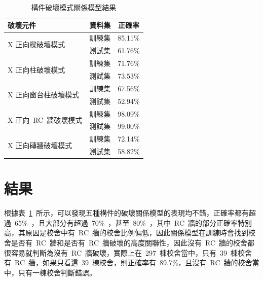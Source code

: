 

\setlength{\tabcolsep}{2em}
{\renewcommand{\arraystretch}{1.5}
\begin{table}[hbtp]
  \begin{center}
    \caption{構件破壞模式關係模型結果}
    \label{tab:comp_result}
    \begin{tabular}{l c c}
    	\hline
    	破壞元件 & 資料集 & 正確率 \\
    	\hline
    	\multirow{2}{*}{X 正向樑破壞模式} & 訓練集 & 85.11\% \\
    	\cline{2-3} & 測試集 & 61.76\% \\
    	\hline
    	\multirow{2}{*}{X 正向柱破壞模式} & 訓練集 & 71.76\% \\
    	\cline{2-3} & 測試集 & 73.53\% \\
    	\hline
    	\multirow{2}{*}{X 正向窗台柱破壞模式} & 訓練集 & 67.56\% \\
    	\cline{2-3} & 測試集 & 52.94\% \\
    	\hline
    	\multirow{2}{*}{X 正向~RC~牆破壞模式} & 訓練集 & 98.09\% \\
    	\cline{2-3} & 測試集 & 99.00\% \\
    	\hline
    	\multirow{2}{*}{X 正向磚牆破壞模式} & 訓練集 & 72.14\% \\
    	\cline{2-3} & 測試集 & 58.82\% \\
    	\hline
    \end{tabular}
  \end{center}
\end{table}
}

\section{結果}

根據表~\ref{tab:comp_result}~所示，可以發現五種構件的破壞關係模型的表現均不錯，正確率都有超過~65\%~，且大部分有超過~70\%~，甚至~80\%~，其中~RC~牆的部分正確率特別高，其原因是校舍中有~RC~牆的校舍比例偏低，因此關係模型在訓練時會找到校舍是否有~RC~牆和是否有~RC~牆破壞的高度關聯性，因此沒有~RC~牆的校舍都很容易就判斷為沒有~RC~牆破壞，實際上在~297~棟校舍當中，只有~39~棟校舍有~RC~牆，如果只看這~39~棟校舍，則正確率有~89.7\%，且沒有~RC~牆的校舍當中，只有一棟校舍判斷錯誤。



